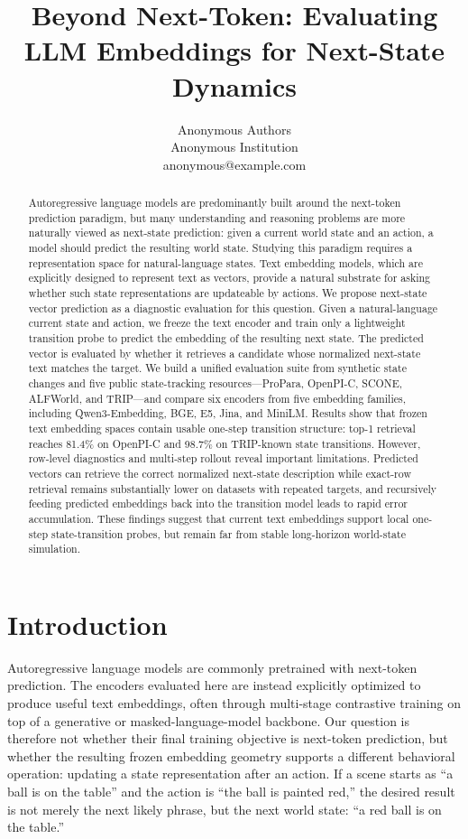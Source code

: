 \documentclass{article}
\title{Beyond Next-Token: Evaluating LLM Embeddings for Next-State Dynamics}
\author{%
  Anonymous Authors\\
  Anonymous Institution\\
  anonymous@example.com
}
\begin{document}
\maketitle

\begin{abstract}
Autoregressive language models are predominantly built around the next-token prediction paradigm, but many understanding and reasoning problems are more naturally viewed as next-state prediction: given a current world state and an action, a model should predict the resulting world state. Studying this paradigm requires a representation space for natural-language states. Text embedding models, which are explicitly designed to represent text as vectors, provide a natural substrate for asking whether such state representations are updateable by actions. We propose next-state vector prediction as a diagnostic evaluation for this question. Given a natural-language current state and action, we freeze the text encoder and train only a lightweight transition probe to predict the embedding of the resulting next state. The predicted vector is evaluated by whether it retrieves a candidate whose normalized next-state text matches the target. We build a unified evaluation suite from synthetic state changes and five public state-tracking resources—ProPara, OpenPI-C, SCONE, ALFWorld, and TRIP—and compare six encoders from five embedding families, including Qwen3-Embedding, BGE, E5, Jina, and MiniLM. Results show that frozen text embedding spaces contain usable one-step transition structure: top-1 retrieval reaches 81.4\% on OpenPI-C and 98.7\% on TRIP-known state transitions. However, row-level diagnostics and multi-step rollout reveal important limitations. Predicted vectors can retrieve the correct normalized next-state description while exact-row retrieval remains substantially lower on datasets with repeated targets, and recursively feeding predicted embeddings back into the transition model leads to rapid error accumulation. These findings suggest that current text embeddings support local one-step state-transition probes, but remain far from stable long-horizon world-state simulation.
\end{abstract}

\section{Introduction}

Autoregressive language models are commonly pretrained with next-token prediction. The encoders evaluated here are instead explicitly optimized to produce useful text embeddings, often through multi-stage contrastive training on top of a generative or masked-language-model backbone. Our question is therefore not whether their final training objective is next-token prediction, but whether the resulting frozen embedding geometry supports a different behavioral operation: updating a state representation after an action. If a scene starts as ``a ball is on the table'' and the action is ``the ball is painted red,'' the desired result is not merely the next likely phrase, but the next world state: ``a red ball is on the table.''
\end{document}
